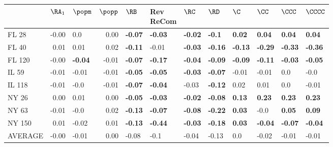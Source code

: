 \begin{tabular}{lrlrllllllll}
\toprule
{} &  $\RA_1$ &         $\popm$ &  $\popp$ &           $\RB$ & \makecell{Rev \\ ReCom} &           $\RC$ &           $\RD$ &            $\C$ &           $\CC$ &          $\CCC$ &         $\CCCC$ \\
\midrule
FL 28   &    -0.00 &             0.0 &     0.00 &  \textbf{-0.07} &          \textbf{-0.03} &  \textbf{-0.02} &   \textbf{-0.1} &   \textbf{0.02} &   \textbf{0.04} &   \textbf{0.04} &   \textbf{0.04} \\
FL 40   &     0.01 &            0.01 &     0.02 &  \textbf{-0.11} &                   -0.01 &  \textbf{-0.03} &  \textbf{-0.16} &  \textbf{-0.13} &  \textbf{-0.29} &  \textbf{-0.33} &  \textbf{-0.36} \\
FL 120  &    -0.00 &  \textbf{-0.04} &    -0.01 &  \textbf{-0.07} &          \textbf{-0.17} &  \textbf{-0.04} &  \textbf{-0.09} &  \textbf{-0.09} &  \textbf{-0.11} &  \textbf{-0.03} &  \textbf{-0.05} \\
IL 59   &    -0.01 &           -0.01 &    -0.01 &  \textbf{-0.05} &          \textbf{-0.05} &  \textbf{-0.03} &  \textbf{-0.07} &           -0.01 &           -0.01 &             0.0 &            -0.0 \\
IL 118  &    -0.01 &            -0.0 &    -0.01 &  \textbf{-0.07} &          \textbf{-0.04} &           -0.03 &  \textbf{-0.12} &            0.02 &            0.01 &             0.0 &           -0.01 \\
NY 26   &     0.00 &            0.01 &     0.00 &  \textbf{-0.05} &          \textbf{-0.03} &  \textbf{-0.02} &  \textbf{-0.08} &   \textbf{0.13} &   \textbf{0.23} &   \textbf{0.23} &   \textbf{0.23} \\
NY 63   &    -0.01 &            -0.0 &     0.02 &  \textbf{-0.13} &          \textbf{-0.07} &  \textbf{-0.08} &  \textbf{-0.22} &   \textbf{0.03} &            -0.0 &   \textbf{0.05} &   \textbf{0.09} \\
NY 150  &     0.01 &           -0.02 &     0.01 &  \textbf{-0.13} &          \textbf{-0.44} &  \textbf{-0.03} &  \textbf{-0.18} &   \textbf{0.03} &  \textbf{-0.04} &  \textbf{-0.07} &  \textbf{-0.04} \\
AVERAGE &    -0.00 &           -0.01 &     0.00 &           -0.08 &                    -0.1 &           -0.04 &           -0.13 &             0.0 &           -0.02 &           -0.01 &           -0.01 \\
\bottomrule
\end{tabular}
